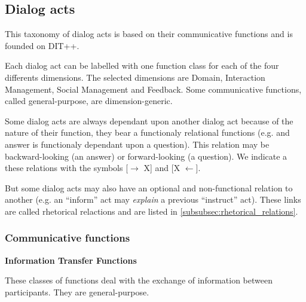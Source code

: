 \subsection{Dialog acts}
\label{subsec:dialog_acts}

This taxonomy of dialog acts is based on their communicative functions and is founded on DIT++\cite{bunt2009dit++}. 

Each dialog act can be labelled with one function class for each of the four differents dimensions. The selected dimensions are Domain, Interaction Management, Social Management and Feedback. Some communicative functions, called general-purpose, are dimension-generic.

Some dialog acts are always dependant upon another dialog act because of the nature of their function, they bear a functionaly relational functions (e.g. and answer is functionaly dependant upon a question). This relation may be backward-looking (an answer) or forward-looking (a question). We indicate a these relations with the symbols [$\rightarrow$ X] and [X $\leftarrow$].

But some dialog acts may also have an optional and non-functional relation to another (e.g. an ``inform'' act may \textit{explain} a previous ``instruct'' act). These links are called rhetorical relactions and are listed in \ref{subsubsec:rhetorical_relations}.

\subsubsection{Communicative functions}

\textbf{Information Transfer Functions}
\vspace{0.1cm}

These classes of functions deal with the exchange of information between participants. They are general-purpose.

